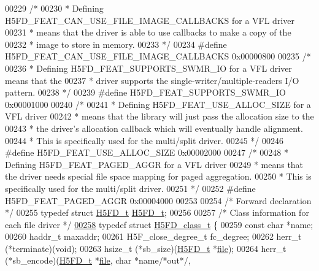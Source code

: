\begin{DoxyCode}
00229     \textcolor{comment}{/*}
00230 \textcolor{comment}{     * Defining H5FD\_FEAT\_CAN\_USE\_FILE\_IMAGE\_CALLBACKS for a VFL driver}
00231 \textcolor{comment}{     * means that the driver is able to use callbacks to make a copy of the}
00232 \textcolor{comment}{     * image to store in memory.}
00233 \textcolor{comment}{     */}
00234 \textcolor{preprocessor}{#define H5FD\_FEAT\_CAN\_USE\_FILE\_IMAGE\_CALLBACKS 0x00000800}
00235     \textcolor{comment}{/*}
00236 \textcolor{comment}{     * Defining H5FD\_FEAT\_SUPPORTS\_SWMR\_IO for a VFL driver means that the}
00237 \textcolor{comment}{     * driver supports the single-writer/multiple-readers I/O pattern.}
00238 \textcolor{comment}{     */}
00239 \textcolor{preprocessor}{#define H5FD\_FEAT\_SUPPORTS\_SWMR\_IO      0x00001000}
00240     \textcolor{comment}{/*}
00241 \textcolor{comment}{     * Defining H5FD\_FEAT\_USE\_ALLOC\_SIZE for a VFL driver}
00242 \textcolor{comment}{     * means that the library will just pass the allocation size to the}
00243 \textcolor{comment}{     * the driver's allocation callback which will eventually handle alignment.}
00244 \textcolor{comment}{     * This is specifically used for the multi/split driver.}
00245 \textcolor{comment}{     */}
00246 \textcolor{preprocessor}{#define H5FD\_FEAT\_USE\_ALLOC\_SIZE    0x00002000}
00247     \textcolor{comment}{/*}
00248 \textcolor{comment}{     * Defining H5FD\_FEAT\_PAGED\_AGGR for a VFL driver}
00249 \textcolor{comment}{     * means that the driver needs special file space mapping for paged aggregation.}
00250 \textcolor{comment}{     * This is specifically used for the multi/split driver.}
00251 \textcolor{comment}{     */}
00252 \textcolor{preprocessor}{#define H5FD\_FEAT\_PAGED\_AGGR        0x00004000}
00253 
00254 \textcolor{comment}{/* Forward declaration */}
00255 \textcolor{keyword}{typedef} \textcolor{keyword}{struct }\hyperlink{struct_h5_f_d__t}{H5FD\_t} \hyperlink{struct_h5_f_d__t}{H5FD\_t};
00256 
00257 \textcolor{comment}{/* Class information for each file driver */}
\hyperlink{struct_h5_f_d__class__t}{00258} \textcolor{keyword}{typedef} \textcolor{keyword}{struct }\hyperlink{struct_h5_f_d__class__t}{H5FD\_class\_t} \{
00259     \textcolor{keyword}{const} \textcolor{keywordtype}{char} *name;
00260     haddr\_t maxaddr;
00261     H5F\_close\_degree\_t fc\_degree;
00262     herr\_t  (*terminate)(void);
00263     hsize\_t (*sb\_size)(\hyperlink{struct_h5_f_d__t}{H5FD\_t} *\hyperlink{structfile}{file});
00264     herr\_t  (*sb\_encode)(\hyperlink{struct_h5_f_d__t}{H5FD\_t} *\hyperlink{structfile}{file}, \textcolor{keywordtype}{char} *name\textcolor{comment}{/*out*/},

\end{DoxyCode}
